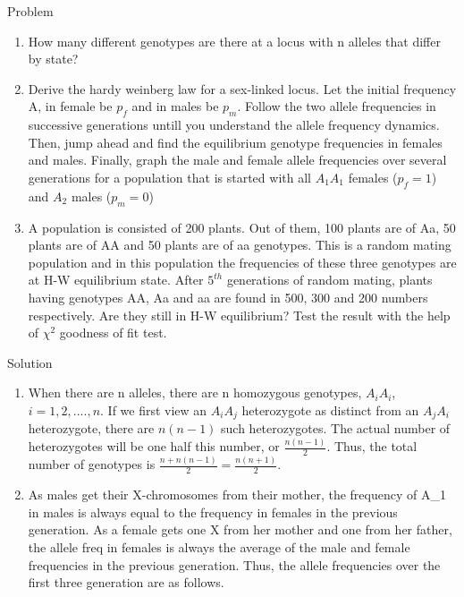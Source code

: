 \documentclass[11pt,dvipsnames,ignorenonframetext,aspectratio=169]{beamer}
\begin{document}
\begin{frame}{Problem}
\protect\hypertarget{problem}{}
\begin{enumerate}
\item
  How many different genotypes are there at a locus with n alleles that
  differ by state?
\item
  Derive the hardy weinberg law for a sex-linked locus. Let the initial
  frequency A, in female be \(p_f\) and in males be \(p_m\). Follow the
  two allele frequencies in successive generations untill you understand
  the allele frequency dynamics. Then, jump ahead and find the
  equilibrium genotype frequencies in females and males. Finally, graph
  the male and female allele frequencies over several generations for a
  population that is started with all \(A_1A_1\) females (\(p_f = 1\))
  and \(A_2\) males (\(p_m = 0\))
\item
  A population is consisted of 200 plants. Out of them, 100 plants are
  of Aa, 50 plants are of AA and 50 plants are of aa genotypes. This is
  a random mating population and in this population the frequencies of
  these three genotypes are at H-W equilibrium state. After \(5^{th}\)
  generations of random mating, plants having genotypes AA, Aa and aa
  are found in 500, 300 and 200 numbers respectively. Are they still in
  H-W equilibrium? Test the result with the help of \(\chi^2\) goodness
  of fit test.
\end{enumerate}
\end{frame}

\begin{frame}{Solution}
\protect\hypertarget{solution}{}
\begin{enumerate}
\item
  When there are n alleles, there are n homozygous genotypes,
  \(A_iA_i\), \(i = 1, 2, ...., n\). If we first view an \(A_iA_j\)
  heterozygote as distinct from an \(A_jA_i\) heterozygote, there are
  \(n(n-1)\) such heterozygotes. The actual number of heterozygotes will
  be one half this number, or \(\frac{n(n-1)}{2}\). Thus, the total
  number of genotypes is \(\frac{n+n(n-1)}{2}= \frac{n(n+1)}{2}\).
\item
  As males get their X-chromosomes from their mother, the frequency of
  A\_1 in males is always equal to the frequency in females in the
  previous generation. As a female gets one X from her mother and one
  from her father, the allele freq in females is always the average of
  the male and female frequencies in the previous generation. Thus, the
  allele frequencies over the first three generation are as follows.
\end{enumerate}
\end{frame}
\end{document}
